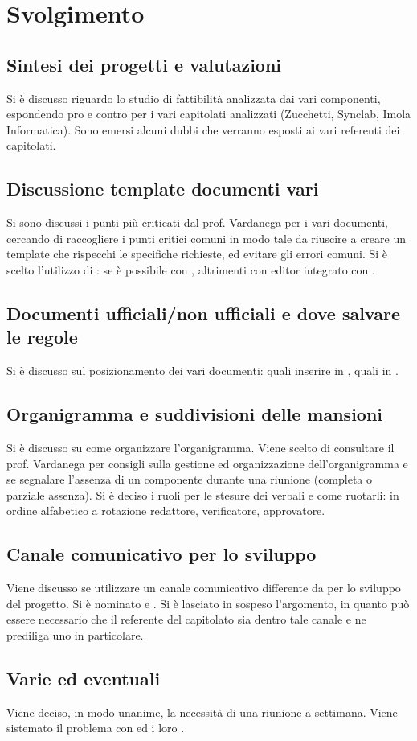 \newpage
\section*{Svolgimento}

	\subsection*{Sintesi dei progetti e valutazioni}
		Si è discusso riguardo lo studio di fattibilità analizzata dai vari componenti, espondendo pro e contro per i vari capitolati analizzati (Zucchetti, Synclab, Imola Informatica). Sono emersi alcuni dubbi che verranno esposti ai vari referenti dei capitolati.

	\subsection*{Discussione template documenti vari}
		Si sono discussi i punti più criticati dal prof. Vardanega per i vari documenti, cercando di raccogliere i punti critici comuni in modo tale da riuscire a creare un template che rispecchi le specifiche richieste, ed evitare gli errori comuni. Si è scelto l'utilizzo di \glock{\LaTeX}: se è possibile con , altrimenti con editor \glock{\LaTeX} integrato con .

	\subsection*{Documenti ufficiali/non ufficiali e dove salvare le regole}
		Si è discusso sul posizionamento dei vari documenti: quali inserire in , quali in .
		
	\subsection*{Organigramma e suddivisioni delle mansioni}
		Si è discusso su come organizzare l'organigramma. Viene scelto di consultare il prof. Vardanega per consigli sulla gestione ed organizzazione dell'organigramma e se segnalare l'assenza di un componente durante una riunione (completa o parziale assenza). Si è deciso i ruoli per le stesure dei verbali e come ruotarli: in ordine alfabetico a rotazione redattore, verificatore, approvatore.
	
	\subsection*{Canale comunicativo per lo sviluppo}
		Viene discusso se utilizzare un canale comunicativo differente da  per lo sviluppo del progetto. Si è nominato  e . Si è lasciato in sospeso l'argomento, in quanto può essere necessario che il referente del capitolato sia dentro tale canale e ne prediliga uno in particolare.
		
	\subsection*{Varie ed eventuali}
		Viene deciso, in modo unanime, la necessità di una riunione a settimana.
		Viene sistemato il problema con  ed i loro .